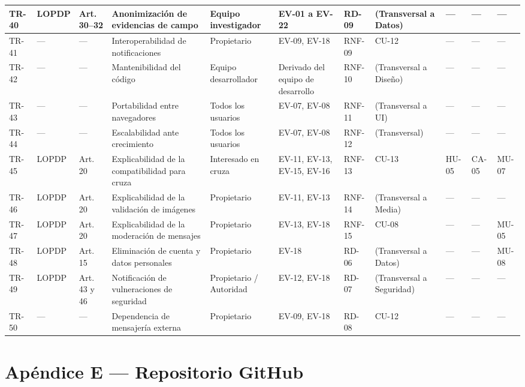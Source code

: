 \documentclass[journal,onecolumn]{IEEEtran}
\begin{document}
\begin{landscape}
\begin{longtable}{@{}p{0.8cm} p{1.3cm} p{1.5cm} p{2.2cm} p{1.5cm} p{1.8cm} p{1.6cm} p{1.3cm} p{1.3cm} p{1.3cm} p{1.5cm}@{}}
			TR-40 & LOPDP & Art. 30--32 & Anonimización de evidencias de campo & Equipo investigador & EV-01 a EV-22 & RD-09 & (Transversal a Datos) & --- & --- & --- \\ \midrule
			TR-41 & --- & --- & Interoperabilidad de notificaciones & Propietario & EV-09, EV-18 & RNF-09 & CU-12 & --- & --- & --- \\ \midrule
			TR-42 & --- & --- & Mantenibilidad del código & Equipo desarrollador & Derivado del equipo de desarrollo & RNF-10 & (Transversal a Diseño) & --- & --- & --- \\ \midrule
			TR-43 & --- & --- & Portabilidad entre navegadores & Todos los usuarios & EV-07, EV-08 & RNF-11 & (Transversal a UI) & --- & --- & --- \\ \midrule
			TR-44 & --- & --- & Escalabilidad ante crecimiento & Todos los usuarios & EV-07, EV-08 & RNF-12 & (Transversal) & --- & --- & --- \\ \midrule
			TR-45 & LOPDP & Art. 20 & Explicabilidad de la compatibilidad para cruza & Interesado en cruza & EV-11, EV-13, EV-15, EV-16 & RNF-13 & CU-13 & HU-05 & CA-05 & MU-07 \\ \midrule
			TR-46 & LOPDP & Art. 20 & Explicabilidad de la validación de imágenes & Propietario & EV-11, EV-13 & RNF-14 & (Transversal a Media) & --- & --- & --- \\ \midrule
			TR-47 & LOPDP & Art. 20 & Explicabilidad de la moderación de mensajes & Propietario & EV-13, EV-18 & RNF-15 & CU-08 & --- & --- & MU-05 \\ \midrule
			TR-48 & LOPDP & Art. 15 & Eliminación de cuenta y datos personales & Propietario & EV-18 & RD-06 & (Transversal a Datos) & --- & --- & MU-08 \\ \midrule
			TR-49 & LOPDP & Art. 43 y 46 & Notificación de vulneraciones de seguridad & Propietario / Autoridad & EV-12, EV-18 & RD-07 & (Transversal a Seguridad) & --- & --- & --- \\ \midrule
			TR-50 & --- & --- & Dependencia de mensajería externa & Propietario & EV-09, EV-18 & RD-08 & CU-12 & --- & --- & --- \\
			
		\end{longtable}
	\end{landscape}
	
	\section*{Apéndice E --- Repositorio GitHub}
	\label{ap:repositorio}
	
\end{document}

